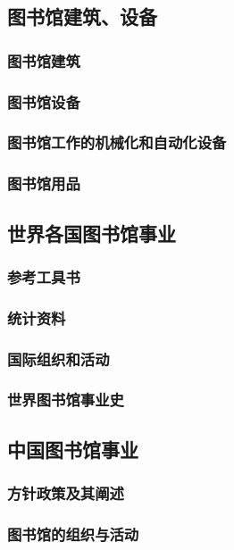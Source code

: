 \documentclass[UTF8]{../../ApplicationUniverse}
\begin{document}
\subsection{图书馆建筑、设备}
    \subsubsection{图书馆建筑}
    \subsubsection{图书馆设备}
    \subsubsection{图书馆工作的机械化和自动化设备}
    \subsubsection{图书馆用品}

\subsection{世界各国图书馆事业}
    \subsubsection{参考工具书}
    \subsubsection{统计资料}
    \subsubsection{国际组织和活动}
    \subsubsection{世界图书馆事业史}

\subsection{中国图书馆事业}
    \subsubsection{方针政策及其阐述}
    \subsubsection{图书馆的组织与活动}
\end{document}
